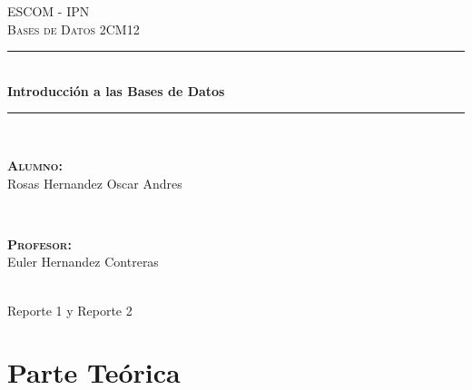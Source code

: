 \documentclass[12pt, fleqn]{article}                             %
\author{Oscar Andrés Rosas}                                     %
\begin{document}
\begin{titlepage}

    \center
    \textsc{\Large ESCOM - IPN}\\[0.5cm] 
    \textsc{\large Bases de Datos 2CM12}\\[1.5cm]

    \rule{\linewidth}{0.5mm} \\[1.0cm]
        { \huge \bfseries Introducción a las Bases de Datos}\\[1.0cm] 
    \rule{\linewidth}{0.5mm} \\[2.0cm]
     
    \begin{minipage}{0.4\textwidth}
        \begin{flushleft} \large
            \textbf{\textsc{Alumno:}}\\
            Rosas Hernandez Oscar Andres
        \end{flushleft}
    \end{minipage}
    ~
    \begin{minipage}{0.4\textwidth}
        \begin{flushright} \large
            \textbf{\textsc{Profesor: }}\\
            Euler Hernandez Contreras
        \end{flushright}
    \end{minipage}\\[3,5cm]

    {\LARGE Reporte 1 y Reporte 2}\\[4cm] 
    
    
    \vfill

\end{titlepage}









\section{Parte Teórica}
\end{document}

